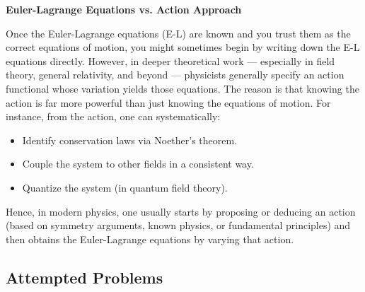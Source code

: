 \documentclass[a4paper]{article}
\begin{document}
    \textbf{Euler-Lagrange Equations vs. Action Approach}

    Once the Euler-Lagrange equations (E-L) are known and you trust them as the correct equations of motion, you might sometimes begin by writing down the E-L equations directly. However, in deeper theoretical work — especially in field theory, general relativity, and beyond — physicists generally specify an action functional whose variation yields those equations. The reason is that knowing the action is far more powerful than just knowing the equations of motion. For instance, from the action, one can systematically:
    \begin{itemize}
        \item Identify conservation laws via Noether's theorem.
        \item Couple the system to other fields in a consistent way.
        \item Quantize the system (in quantum field theory).
    \end{itemize}
    Hence, in modern physics, one usually starts by proposing or deducing an action (based on symmetry arguments, known physics, or fundamental principles) and then obtains the Euler-Lagrange equations by varying that action.

    \subsection{Attempted Problems}
\end{document}

